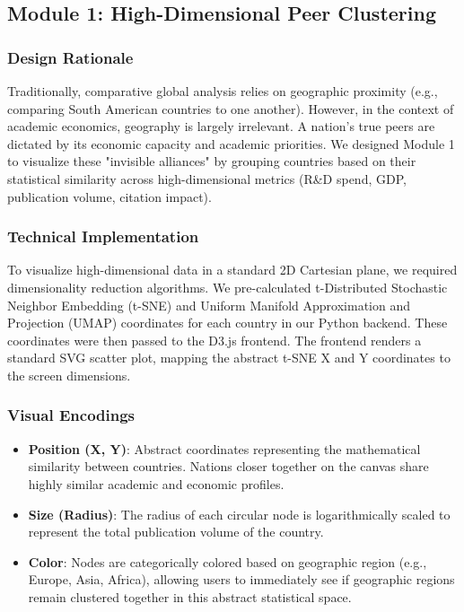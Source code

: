 \documentclass[12pt,a4paper]{article}
\begin{document}
\subsection{Module 1: High-Dimensional Peer Clustering}
\subsubsection{Design Rationale}
Traditionally, comparative global analysis relies on geographic proximity (e.g., comparing South American countries to one another). However, in the context of academic economics, geography is largely irrelevant. A nation's true peers are dictated by its economic capacity and academic priorities. We designed Module 1 to visualize these "invisible alliances" by grouping countries based on their statistical similarity across high-dimensional metrics (R\&D spend, GDP, publication volume, citation impact).

\subsubsection{Technical Implementation}
To visualize high-dimensional data in a standard 2D Cartesian plane, we required dimensionality reduction algorithms. We pre-calculated t-Distributed Stochastic Neighbor Embedding (t-SNE) and Uniform Manifold Approximation and Projection (UMAP) coordinates for each country in our Python backend. These coordinates were then passed to the D3.js frontend. The frontend renders a standard SVG scatter plot, mapping the abstract t-SNE X and Y coordinates to the screen dimensions.

\subsubsection{Visual Encodings}
\begin{itemize}
    \item \textbf{Position (X, Y)}: Abstract coordinates representing the mathematical similarity between countries. Nations closer together on the canvas share highly similar academic and economic profiles.
    \item \textbf{Size (Radius)}: The radius of each circular node is logarithmically scaled to represent the total publication volume of the country.
    \item \textbf{Color}: Nodes are categorically colored based on geographic region (e.g., Europe, Asia, Africa), allowing users to immediately see if geographic regions remain clustered together in this abstract statistical space.
\end{itemize}
\end{document}
